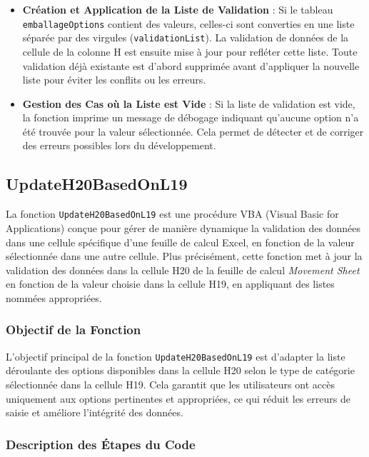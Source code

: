 \documentclass[a4paper, oneside, 12pt, final]{extreport}
\begin{document}
\begin{itemize}
    \item \textbf{Création et Application de la Liste de Validation} : Si le tableau \texttt{emballageOptions} contient des valeurs, celles-ci sont converties en une liste séparée par des virgules (\texttt{validationList}). La validation de données de la cellule de la colonne H est ensuite mise à jour pour refléter cette liste. Toute validation déjà existante est d'abord supprimée avant d'appliquer la nouvelle liste pour éviter les conflits ou les erreurs.

    \item \textbf{Gestion des Cas où la Liste est Vide} : Si la liste de validation est vide, la fonction imprime un message de débogage indiquant qu'aucune option n'a été trouvée pour la valeur sélectionnée. Cela permet de détecter et de corriger des erreurs possibles lors du développement.
\end{itemize}

\subsection{UpdateH20BasedOnL19}
La fonction \texttt{UpdateH20BasedOnL19} est une procédure VBA (Visual Basic for Applications) conçue pour gérer de manière dynamique la validation des données dans une cellule spécifique d'une feuille de calcul Excel, en fonction de la valeur sélectionnée dans une autre cellule. Plus précisément, cette fonction met à jour la validation des données dans la cellule H20 de la feuille de calcul \textit{Movement Sheet} en fonction de la valeur choisie dans la cellule H19, en appliquant des listes nommées appropriées.

\subsubsection{Objectif de la Fonction}
L'objectif principal de la fonction \texttt{UpdateH20BasedOnL19} est d'adapter la liste déroulante des options disponibles dans la cellule H20 selon le type de catégorie sélectionnée dans la cellule H19. Cela garantit que les utilisateurs ont accès uniquement aux options pertinentes et appropriées, ce qui réduit les erreurs de saisie et améliore l'intégrité des données.

\subsubsection{Description des Étapes du Code}
\end{document}
